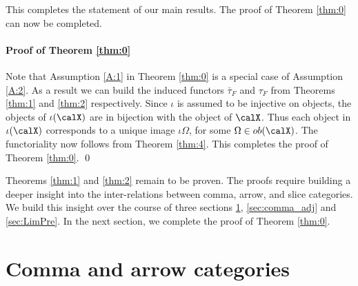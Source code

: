 \documentclass[12pt,oneside]{article}
\begin{document}
This completes the statement of our main results. The proof of Theorem \ref{thm:0} can now be completed.

\paragraph{Proof of Theorem \ref{thm:0}} Note that Assumption \ref{A:1} in Theorem \ref{thm:0} is a special case of Assumption \ref{A:2}. As a result we can build the induced functors $\bar{\tau}_F$ and $\tau_F$ from Theorems \ref{thm:1} and \ref{thm:2} respectively. Since $\iota$ is assumed to be injective on objects, the objects of $\iota(\calX)$ are in bijection with the object of $\calX$. Thus each object in $\iota(\calX)$ corresponds to a unique image $\iota \Omega$, for some $\Omega \in ob(\calX)$. The functoriality now follows from Theorem \ref{thm:4}. This completes the proof of Theorem \ref{thm:0}. \qed 

Theorems \ref{thm:1} and \ref{thm:2} remain to be proven. The proofs require building a deeper insight into the inter-relations between comma, arrow, and slice categories. We build this insight over the course of three sections \ref{sec:comma_arr}, \ref{sec:comma_adj} and \ref{sec:LimPre}. In the next section, we complete the proof of Theorem \ref{thm:0}.

\section{Comma and arrow categories} \label{sec:comma_arr}
\end{document}
